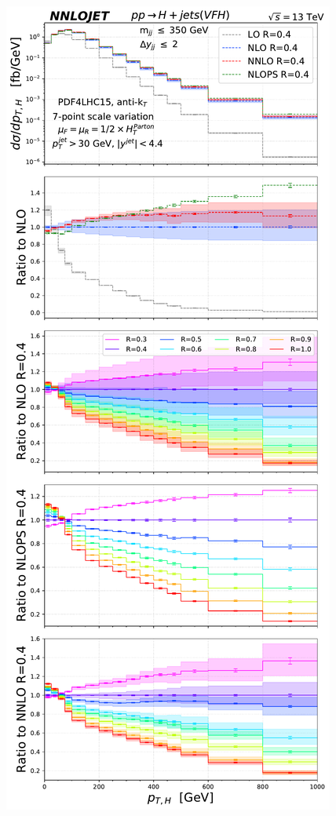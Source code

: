 \documentclass[10pt,prd,fleqn,superscriptaddress,notitlepage,nofootinbib,preprintnumbers,nobalancelastpage]{revtex4-1}
\begin{document}
\begin{figure}[t]
\centering
\includegraphics[scale=0.3]{figures/rdep/LH19VFH_pth_largebin_light_center.pdf}\hfill

\end{figure}
\end{document}
